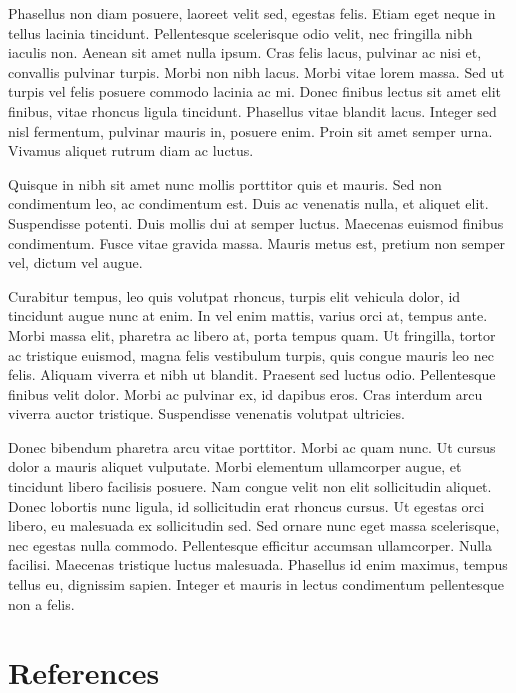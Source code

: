 \documentclass[
  letterpaper,
  oneside,
  open=any]{scrbook}
\begin{document}
Phasellus non diam posuere, laoreet velit sed, egestas felis. Etiam eget
neque in tellus lacinia tincidunt. Pellentesque scelerisque odio velit,
nec fringilla nibh iaculis non. Aenean sit amet nulla ipsum. Cras felis
lacus, pulvinar ac nisi et, convallis pulvinar turpis. Morbi non nibh
lacus. Morbi vitae lorem massa. Sed ut turpis vel felis posuere commodo
lacinia ac mi. Donec finibus lectus sit amet elit finibus, vitae rhoncus
ligula tincidunt. Phasellus vitae blandit lacus. Integer sed nisl
fermentum, pulvinar mauris in, posuere enim. Proin sit amet semper urna.
Vivamus aliquet rutrum diam ac luctus.

Quisque in nibh sit amet nunc mollis porttitor quis et mauris. Sed non
condimentum leo, ac condimentum est. Duis ac venenatis nulla, et aliquet
elit. Suspendisse potenti. Duis mollis dui at semper luctus. Maecenas
euismod finibus condimentum. Fusce vitae gravida massa. Mauris metus
est, pretium non semper vel, dictum vel augue.

Curabitur tempus, leo quis volutpat rhoncus, turpis elit vehicula dolor,
id tincidunt augue nunc at enim. In vel enim mattis, varius orci at,
tempus ante. Morbi massa elit, pharetra ac libero at, porta tempus quam.
Ut fringilla, tortor ac tristique euismod, magna felis vestibulum
turpis, quis congue mauris leo nec felis. Aliquam viverra et nibh ut
blandit. Praesent sed luctus odio. Pellentesque finibus velit dolor.
Morbi ac pulvinar ex, id dapibus eros. Cras interdum arcu viverra auctor
tristique. Suspendisse venenatis volutpat ultricies.

Donec bibendum pharetra arcu vitae porttitor. Morbi ac quam nunc. Ut
cursus dolor a mauris aliquet vulputate. Morbi elementum ullamcorper
augue, et tincidunt libero facilisis posuere. Nam congue velit non elit
sollicitudin aliquet. Donec lobortis nunc ligula, id sollicitudin erat
rhoncus cursus. Ut egestas orci libero, eu malesuada ex sollicitudin
sed. Sed ornare nunc eget massa scelerisque, nec egestas nulla commodo.
Pellentesque efficitur accumsan ullamcorper. Nulla facilisi. Maecenas
tristique luctus malesuada. Phasellus id enim maximus, tempus tellus eu,
dignissim sapien. Integer et mauris in lectus condimentum pellentesque
non a felis.


\hypertarget{references}{%
\chapter*{References}\label{references}}
\end{document}
